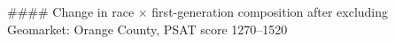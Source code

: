 #### Change in race × first-generation composition after excluding Geomarket: Orange County, PSAT score 1270–1520
